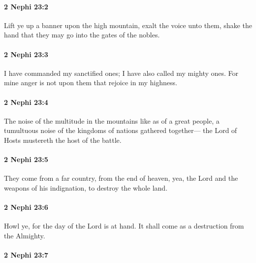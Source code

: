 		\paragraph{2 Nephi 23:2} %
			\label{2NEPHI-23-2}

			Lift ye up a banner upon the high mountain,
			exalt the voice unto them,
			shake the hand that they may go into the gates of the nobles.

		\paragraph{2 Nephi 23:3} %
			\label{2NEPHI-23-3}

			I have commanded my sanctified ones;
			I have also called my mighty ones.
			For mine anger is not upon them that rejoice in my highness.

		\paragraph{2 Nephi 23:4} %
			\label{2NEPHI-23-4}

			The noise of the multitude in the mountains like as of a great people,
			a tumultuous noise of the kingdoms of nations gathered together---
			the Lord of Hosts mustereth the host of the battle.

		\paragraph{2 Nephi 23:5} %
			\label{2NEPHI-23-5}

			They come from a far country, from the end of heaven,
			yea, the Lord and the weapons of his indignation,
			to destroy the whole land.

		\paragraph{2 Nephi 23:6} %
			\label{2NEPHI-23-6}

			Howl ye, for the day of the Lord is at hand.
			It shall come as a destruction from the Almighty.

		\paragraph{2 Nephi 23:7} %
			\label{2NEPHI-23-7}


